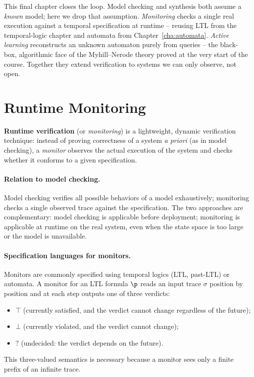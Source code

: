 \documentclass[oneside]{academica}
\begin{document}
This final chapter closes the loop. Model checking and synthesis both assume a \emph{known} model; here we drop that assumption. \emph{Monitoring} checks a single real execution against a temporal specification at runtime -- reusing LTL from the temporal-logic chapter and \Buchi automata from Chapter~\ref{cha:automata}. \emph{Active learning} reconstructs an unknown automaton purely from queries -- the black-box, algorithmic face of the Myhill--Nerode theory proved at the very start of the course. Together they extend verification to systems we can only observe, not open.

\section{Runtime Monitoring}

\textbf{Runtime verification} (or \emph{monitoring}) is a lightweight, dynamic verification technique: instead of proving correctness of a system \emph{a priori} (as in model checking), a \emph{monitor} observes the actual execution of the system and checks whether it conforms to a given specification.

\paragraph{Relation to model checking.}
Model checking verifies all possible behaviors of a model exhaustively; monitoring checks a single observed trace against the specification. The two approaches are complementary: model checking is applicable before deployment; monitoring is applicable at runtime on the real system, even when the state space is too large or the model is unavailable.

\paragraph{Specification languages for monitors.}
Monitors are commonly specified using temporal logics (LTL, past-LTL) or automata. A monitor for an LTL formula $\p$ reads an input trace $\sigma$ position by position and at each step outputs one of three verdicts:
\begin{itemize}
  \item $\top$ (currently satisfied, and the verdict cannot change regardless of the future);
  \item $\bot$ (currently violated, and the verdict cannot change);
  \item $?$ (undecided: the verdict depends on the future).
\end{itemize}
This three-valued semantics is necessary because a monitor sees only a finite prefix of an infinite trace.
\end{document}
